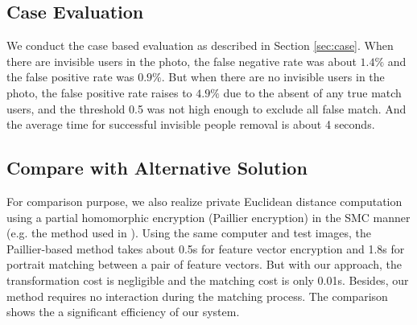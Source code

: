 \vspace{-0.05in}
\subsection{Case Evaluation}
\vspace{-0.05in}
We conduct the case based evaluation as
described in Section \ref{sec:case}.
When there are invisible users in the photo,
 the false negative rate was about $1.4\%$ and the false positive rate was $0.9\%$.
But when there are no invisible users in the photo,
 the false positive rate raises to $4.9\%$ due to the absent of any true match users,
 and the threshold 0.5 was not high enough to exclude all false match.
And the average time for successful invisible people removal is about 4 seconds.

\vspace{-0.05in}
\subsection{Compare with Alternative Solution}
\vspace{-0.05in}
For comparison purpose, we also realize private Euclidean distance computation
 using a partial homomorphic encryption (Paillier encryption)
 in the SMC manner (e.g. the method used in \cite{katz2008predicate}).
Using the same computer and test images, the Paillier-based method takes about 0.5s for feature vector encryption
 and 1.8s for portrait matching between a pair of feature vectors.
But with our approach, the transformation cost is negligible and the matching cost is only 0.01s.
Besides, our method requires no interaction during the matching process.
The comparison shows the a significant efficiency of our system.
